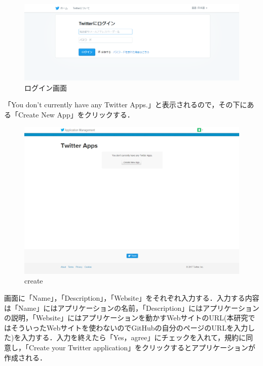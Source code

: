 \begin{figure}[htb]
\centering
\includegraphics[width=13cm]{login.png}
\caption{ログイン画面}\label{login}
\end{figure}

「You don't currently have any Twitter Apps.」と表示されるので，その下にある「Create New App」をクリックする．

\begin{figure}[htb]
\centering
\includegraphics[width=13cm]{create_app.png}
\caption{create}\label{create_app}
\end{figure}
\clearpage
画面に「Name」，「Description」，「Website」をそれぞれ入力する．入力する内容は「Name」にはアプリケーションの名前，「Description」にはアプリケーションの説明，「Website」にはアプリケーションを動かすWebサイトのURL(本研究ではそういったWebサイトを使わないのでGitHubの自分のページのURLを入力した)を入力する．入力を終えたら「Yes，agree」にチェックを入れて，規約に同意し，「Create your Twitter application」をクリックするとアプリケーションが作成される．

